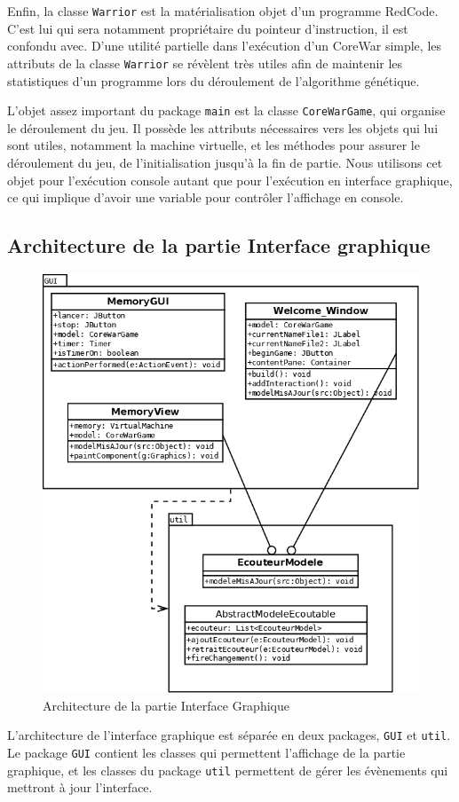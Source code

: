 \documentclass[hidelinks]{report}
\begin{document}
Enfin, la classe \texttt{Warrior} est la matérialisation objet d'un programme RedCode. C'est lui qui sera notamment propriétaire du pointeur d'instruction, il est confondu avec. D'une utilité partielle dans l'exécution d'un CoreWar simple, les attributs de la classe \texttt{Warrior} se révèlent très utiles afin de maintenir les statistiques d'un programme lors du déroulement de l'algorithme génétique.

L'objet assez important du package \texttt{main} est la classe \texttt{CoreWarGame}, qui organise le déroulement du jeu. Il possède les attributs nécessaires vers les objets qui lui sont utiles, notamment la machine virtuelle, et les méthodes pour assurer le déroulement du jeu, de l'initialisation jusqu'à la fin de partie. Nous utilisons cet objet pour l'exécution console autant que pour l'exécution en interface graphique, ce qui implique d'avoir une variable pour contrôler l'affichage en console.

\subsection{Architecture de la partie Interface graphique}

\begin{figure}[h]
    \centering
    \includegraphics[scale=0.4]{images/diagrammes/archiInterface.png}
    \caption{Architecture de la partie Interface Graphique}
\end{figure}
\vspace{1mm}
L'architecture de l'interface graphique est séparée en deux packages, \texttt{GUI} et \texttt{util}. Le package \texttt{GUI} contient les classes qui permettent l'affichage de la partie graphique, et les classes du package \texttt{util} permettent de gérer les évènements qui mettront à jour l'interface.
\end{document}
